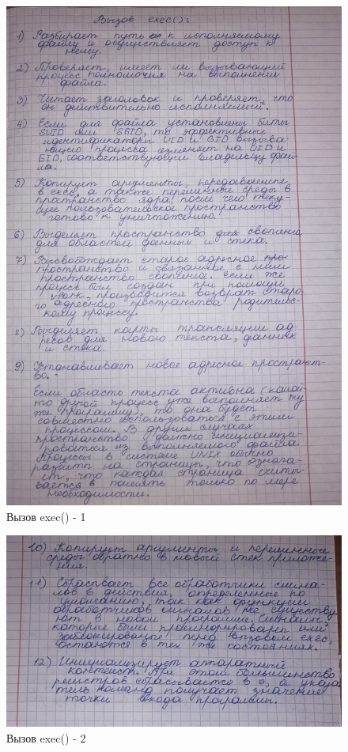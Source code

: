 \begin{figure}[H]
	\begin{center}
		\includegraphics[scale=0.2]{inc/exec1.jpg}
	\end{center}
	\captionsetup{justification=centering}
	\caption{Вызов exec() - 1}
	\label{img:exec1}
\end{figure}

\begin{figure}[H]
	\begin{center}
		\includegraphics[scale=0.3]{inc/exec2.jpg}
	\end{center}
	\captionsetup{justification=centering}
	\caption{Вызов exec() - 2}
	\label{img:exec2}
\end{figure}